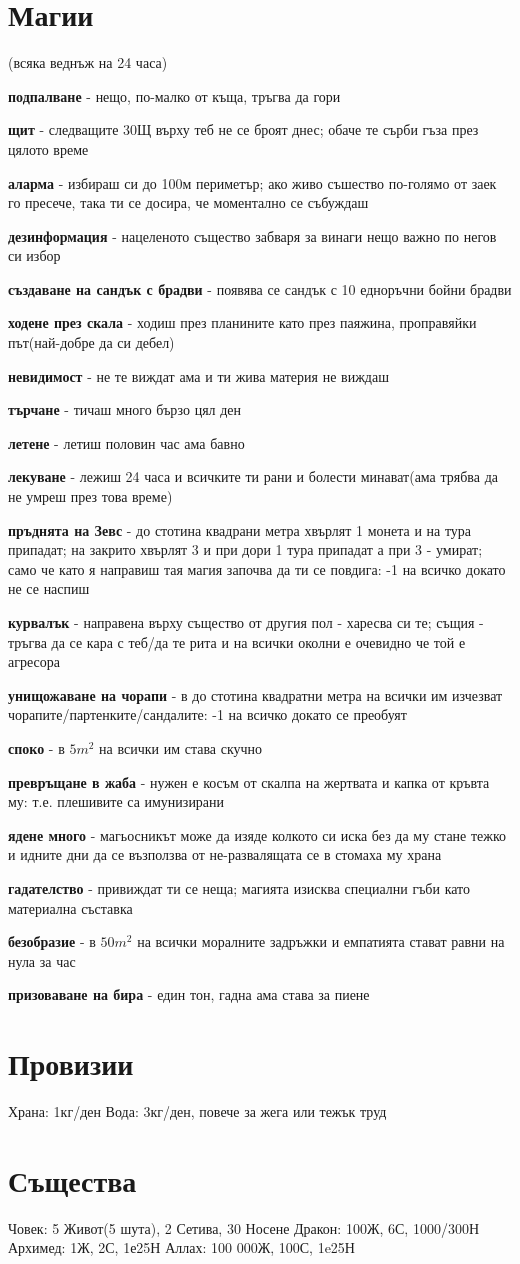 \documentclass{article}
\newcommand{\spell}[2]{\textbf{#1} - #2  \par}
\begin{document}
\section{Магии}
(всяка веднъж на 24 часа)  \\
\par
\spell{подпалване}{нещо, по-малко от къща, тръгва да гори}
\spell{щит}{следващите 30Щ върху теб не се броят днес; обаче те сърби гъза през цялото време}
\spell{аларма}{избираш си до 100м периметър; ако живо съшество по-голямо от заек го пресече, така ти се досира, че моментално се събуждаш}
\spell{дезинформация}{нацеленото същество забваря за винаги нещо важно по негов си избор}
\spell{създаване на сандък с брадви}{появява се сандък с 10 едноръчни бойни брадви}
\spell{ходене през скала}{ходиш през планините като през паяжина, проправяйки път(най-добре да си дебел)}
\spell{невидимост}{не те виждат ама и ти жива материя не виждаш}
\spell{търчане}{тичаш много бързо цял ден}
\spell{летене}{летиш половин час ама бавно}
\spell{лекуване}{лежиш 24 часа и всичките ти рани и болести минават(ама трябва да не умреш през това време)}
\spell{пръднята на Зевс}{до стотина квадрани метра хвърлят 1 монета и на тура припадат; на закрито хвърлят 3 и при дори 1 тура припадат а при 3 - умират; само че като я направиш тая магия започва да ти се повдига: -1 на всичко докато не се наспиш}
\spell{курвалък}{направена върху същество от другия пол - харесва си те; същия - тръгва да се кара с теб/да те рита и на всички околни е очевидно че той е агресора}
\spell{унищожаване на чорапи}{в до стотина квадратни метра на всички им изчезват чорапите/партенките/сандалите: -1 на всичко докато се преобуят}
\spell{споко}{в $5 m^2$ на всички им става скучно}
\spell{превръщане в жаба}{нужен е косъм от скалпа на жертвата и капка от кръвта му: т.е. плешивите са имунизирани}
\spell{ядене много}{магьосникът може да изяде колкото си иска без да му стане тежко и идните дни да се възползва от не-развалящата се в стомаха му храна}
\spell{гадателство}{привиждат ти се неща; магията изисква специални гъби като материална съставка}
\spell{безобразие}{в $50 m^2$ на всички моралните задръжки и емпатията стават равни на нула за час}
\spell{призоваване на бира}{един тон, гадна ама става за пиене}

\section{Провизии}
Храна: 1кг/ден
Вода: 3кг/ден, повече за жега или тежък труд


\section{Същества}
Човек: 5 Живот(5 шута), 2 Сетива, 30 Носене
Дракон: 100Ж, 6С, 1000/300Н
Архимед: 1Ж, 2С, 1е25Н
Аллах: 100 000Ж, 100С, 1e25Н
\end{document}
